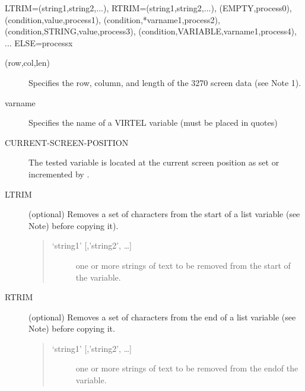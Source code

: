 \documentclass[letterpaper,10pt,english]{sphinxmanual}
\begin{document}
\begin{sphinxVerbatim}

   LTRIM=(\PYGZsq{}string1\PYGZsq{},\PYGZsq{}string2\PYGZsq{},...),
   RTRIM=(\PYGZsq{}string1\PYGZsq{},\PYGZsq{}string2\PYGZsq{},...),
   (EMPTY,process0),
   (condition,\PYGZsq{}value\PYGZsq{},process1),
   (condition,\PYGZsq{}*varname1\PYGZsq{},process2),
   (condition,STRING,\PYGZsq{}value\PYGZsq{},process3),
   (condition,VARIABLE,\PYGZsq{}varname1\PYGZsq{},process4),
 ...
 ELSE=processx
\end{sphinxVerbatim}
\begin{description}
\item[{(row,col,len)}] \leavevmode
Specifies the row, column, and length of the 3270 screen data (see Note 1).

\item[{varname}] \leavevmode
Specifies the name of a VIRTEL variable (must be placed in quotes)

\item[{CURRENT-SCREEN-POSITION}] \leavevmode
The tested variable is located at the current screen position as set or incremented by {\hyperref[\detokenize{User_Guide:v457ug-set-screen-position}]{}}.

\item[{LTRIM}] \leavevmode
(optional) Removes a set of characters from the start of a list variable (see Note) before copying it).
\begin{quote}
\begin{description}
\item[{‘string1’ {[},’string2’, …{]}}] \leavevmode
one or more strings of text to be removed from the start of the variable.

\end{description}
\end{quote}

\item[{RTRIM}] \leavevmode
(optional) Removes a set of characters from the end of a list variable (see Note) before copying it.
\begin{quote}
\begin{description}
\item[{‘string1’ {[},’string2’, …{]}}] \leavevmode
one or more strings of text to be removed from the endof the variable.


\end{description}
\end{quote}
\end{description}
\end{document}
